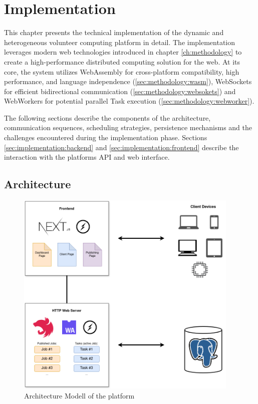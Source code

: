 \chapter{Implementation}
\label{ch:implementation}
This chapter presents the technical implementation of the dynamic and heterogeneous volunteer computing platform in detail. The implementation leverages modern web technologies introduced in chapter \ref{ch:methodology} to create a high-performance distributed computing solution for the web. At its core, the system utilizes WebAssembly for cross-platform compatibility, high performance, and language independence (\ref{sec:methodology:wasm}), WebSockets for efficient bidirectional communication (\ref{sec:methodology:websokets}) and WebWorkers for potential parallel Task execution (\ref{sec:methodology:webworker}).

The following sections describe the components of the architecture, communication sequences, scheduling strategies, persistence mechanisms and the challenges encountered during the implementation phase. Sections \ref{sec:implementation:backend} and \ref{sec:implementation:frontend} describe the interaction with the platforms API and web interface.

\section{Architecture}
\label{sec:implementation:architecture}
\begin{figure}[htbp]
    \centering
    \includegraphics[width=0.95\textwidth]{gfx/figures/WebAssembly-MA.png}
    \caption{Architecture Modell of the platform}
    \label{fig:implementation:architecture}
\end{figure}

